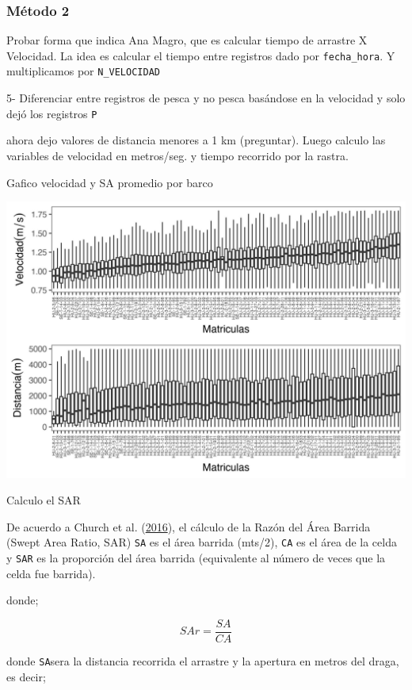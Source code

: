 \documentclass[
]{article}
\begin{document}
\hypertarget{muxe9todo-2}{%
\subsubsection{Método 2}\label{muxe9todo-2}}

Probar forma que indica Ana Magro, que es calcular tiempo de arrastre X Velocidad. La idea es calcular el tiempo entre registros dado por \texttt{fecha\_hora}. Y multiplicamos por \texttt{N\_VELOCIDAD}

5- Diferenciar entre registros de pesca y no pesca basándose en la velocidad y solo dejó los registros \texttt{P}

ahora dejo valores de distancia menores a 1 km (preguntar). Luego calculo las variables de velocidad en metros/seg. y tiempo recorrido por la rastra.

Gafico velocidad y SA promedio por barco

\begin{center}\includegraphics{SAR_Method_files/figure-latex/unnamed-chunk-14-1} \end{center}

Calculo el SAR

De acuerdo a Church et al. (\protect\hyperlink{ref-Church2016}{2016}), el cálculo de la Razón del Área Barrida (Swept Area Ratio, SAR) \texttt{SA} es el área barrida (mts/2), \texttt{CA} es el área de la celda y \texttt{SAR} es la proporción del área barrida (equivalente al número de veces que la celda fue barrida).

donde;

\[
SAr = \frac{SA}{CA}
\]

donde \texttt{SA}sera la distancia recorrida el arrastre y la apertura en metros del draga, es decir;
\end{document}

